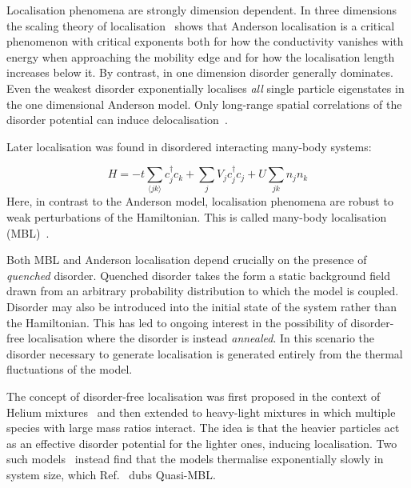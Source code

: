 Localisation phenomena are strongly dimension dependent. In three dimensions the scaling theory of localisation~\autocite{edwardsNumericalStudiesLocalization1972,kramerLocalizationTheoryExperiment1993} shows that Anderson localisation is a critical phenomenon with critical exponents both for how the conductivity vanishes with energy when approaching the mobility edge and for how the localisation length increases below it. By contrast, in one dimension disorder generally dominates. Even the weakest disorder exponentially localises \emph{all} single particle eigenstates in the one dimensional Anderson model. Only long-range spatial correlations of the disorder potential can induce delocalisation~\autocite{aubryAnalyticityBreakingAnderson1980,dassarmaLocalizationMobilityEdges1990,dunlapAbsenceLocalizationRandomdimer1990,izrailevLocalizationMobilityEdge1999,croyAndersonLocalization1D2011,izrailevAnomalousLocalizationLowDimensional2012}.

Later localisation was found in disordered interacting many-body systems:

\[
H = -t\sum_{\langle jk \rangle} c^\dagger_j c_k + \sum_j V_j c_j^\dagger c_j + U\sum_{jk} n_j n_k
\] Here, in contrast to the Anderson model, localisation phenomena are robust to weak perturbations of the Hamiltonian. This is called many-body localisation (MBL)~\autocite{imbrieManyBodyLocalizationQuantum2016,gogolinEquilibrationThermalisationEmergence2016}.

Both MBL and Anderson localisation depend crucially on the presence of \emph{quenched} disorder. Quenched disorder takes the form a static background field drawn from an arbitrary probability distribution to which the model is coupled. Disorder may also be introduced into the initial state of the system rather than the Hamiltonian. This has led to ongoing interest in the possibility of disorder-free localisation where the disorder is instead \emph{annealed}. In this scenario the disorder necessary to generate localisation is generated entirely from the thermal fluctuations of the model.

The concept of disorder-free localisation was first proposed in the context of Helium mixtures~\autocite{kagan1984localization} and then extended to heavy-light mixtures in which multiple species with large mass ratios interact. The idea is that the heavier particles act as an effective disorder potential for the lighter ones, inducing localisation. Two such models~\autocite{yaoQuasiManyBodyLocalizationTranslationInvariant2016,schiulazDynamicsManybodyLocalized2015} instead find that the models thermalise exponentially slowly in system size, which Ref.~\autocite{yaoQuasiManyBodyLocalizationTranslationInvariant2016} dubs Quasi-MBL.

